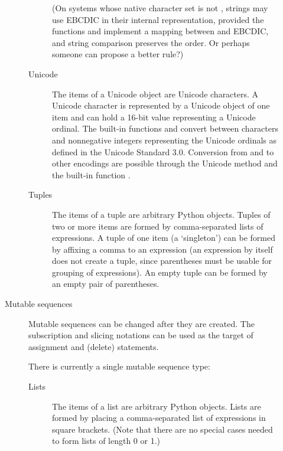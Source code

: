 \begin{description}
\begin{description}
\begin{description}
(On systems whose native character set is not \ASCII, strings may use
EBCDIC in their internal representation, provided the functions
 and  implement a mapping between \ASCII{} and
EBCDIC, and string comparison preserves the \ASCII{} order.
Or perhaps someone can propose a better rule?)

\item[Unicode]
The items of a Unicode object are Unicode characters.  A Unicode
character is represented by a Unicode object of one item and can hold
a 16-bit value representing a Unicode ordinal.  The built-in functions
 and
 convert between characters and
nonnegative integers representing the Unicode ordinals as defined in
the Unicode Standard 3.0. Conversion from and to other encodings are
possible through the Unicode method  and the built-in
function .

\item[Tuples]
The items of a tuple are arbitrary Python objects.
Tuples of two or more items are formed by comma-separated lists
of expressions.  A tuple of one item (a `singleton') can be formed
by affixing a comma to an expression (an expression by itself does
not create a tuple, since parentheses must be usable for grouping of
expressions).  An empty tuple can be formed by an empty pair of
parentheses.

\end{description} %

\item[Mutable sequences]
Mutable sequences can be changed after they are created.  The
subscription and slicing notations can be used as the target of
assignment and  (delete) statements.

There is currently a single mutable sequence type:

\begin{description}

\item[Lists]
The items of a list are arbitrary Python objects.  Lists are formed
by placing a comma-separated list of expressions in square brackets.
(Note that there are no special cases needed to form lists of length 0
or 1.)


\end{description}
\end{description}
\end{description}
